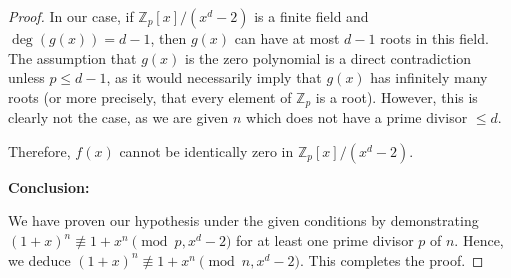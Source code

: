 \documentclass{article}
\theoremstyle{plain}
\theoremstyle{definition}
\begin{document}
\begin{proof}
In our case, if $\mathbb{Z}_p[x]/(x^d - 2)$ is a finite field and $\deg(g(x)) = d-1$, then $g(x)$ can have at most $d-1$ roots in this field. The assumption that $g(x)$ is the zero polynomial is a direct contradiction unless $p \leq d-1$, as it would necessarily imply that $g(x)$ has infinitely many roots (or more precisely, that every element of $\mathbb{Z}_p$ is a root). However, this is clearly not the case, as we are given $n$ which does not have a prime divisor $\leq d$.

Therefore, $f(x)$ cannot be identically zero in $\mathbb{Z}_p[x]/(x^d - 2)$.

\textbf{Conclusion:}

We have proven our hypothesis under the given conditions by demonstrating $(1 + x)^n \not\equiv 1 + x^n \pmod{p, x^d-2}$ for at least one prime divisor $p$ of $n$. Hence, we deduce $(1 + x)^n \not\equiv 1 + x^n \pmod{n, x^d-2}$. This completes the proof.
\end{proof}

\begingroup
\raggedright


\endgroup
\end{document}

